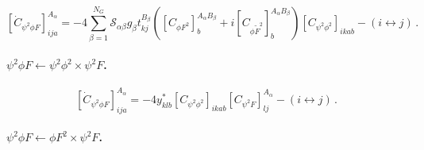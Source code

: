 \begin{equation}
    \left[\dot C_{\psi^2 \phi F}\right]_{ija}^{A_\alpha} = -4 \sum_{\beta=1}^{N_G} \mathcal S_{\alpha\beta} g_\beta t^{B_\beta}_{kj} 
    \left(\left[C_{\phi F^2}\right]^{A_\alpha B_\beta}_b + i \left[C_{\phi \widetilde F^2}\right]^{A_\alpha B_\beta}_b \right) \left[C_{\psi^2\phi^2}\right]_{ikab}  
    - (i \leftrightarrow j)\,.
    \label{psi2phiF_phiF2xpsi2phi2}
\end{equation}

\paragraph{$\psi^2\phi F \leftarrow \psi^2\phi^2 \times \psi^2 F$.}

\begin{equation}
    \left[\dot C_{\psi^2 \phi F}\right]_{ija}^{A_\alpha} = -4 y^*_{klb} \left[C_{\psi^2\phi^2}\right]_{ikab} \left[C_{\psi^2 F}\right]_{lj}^{A_\alpha} - (i \leftrightarrow j) \,.
\end{equation}

\paragraph{$\psi^2\phi F \leftarrow \phi F^2 \times \psi^2 F$.}

